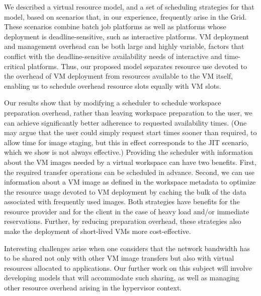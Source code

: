 \documentclass[singlespace]{ccw_chithesis}
\begin{document}
We described a virtual resource model, and a set of scheduling
strategies for that model, based on scenarios that, in our experience,
frequently arise in the Grid. These scenarios combine batch job
platforms as well as platforms whose deployment is
deadline{}-sensitive, such as interactive platforms. VM deployment and
management overhead can be both large and highly variable, factors that
conflict with the deadline{}-sensitive availability needs of
interactive and time{}-critical platforms. Thus, our proposed model
separates resource use devoted to the overhead of VM deployment from
resources available to the VM itself, enabling us to schedule overhead
resource slots equally with VM slots.

Our results show that by modifying a scheduler to schedule workspace
preparation overhead, rather than leaving workspace preparation to the
user, we can achieve significantly better adherence to requested
availability times. (One may argue that the user could simply request
start times sooner than required, to allow time for image staging, but
this in effect corresponds to the JIT scenario, which we show is not
always effective.) Providing the scheduler with information about the
VM images needed by a virtual workspace can have two benefits. First,
the required transfer operations can be scheduled in advance. Second,
we can use information about a VM image as defined in the workspace
metadata to optimize the resource usage devoted to VM deployment by
caching the bulk of the data associated with frequently used images.
Both strategies have benefits for the resource provider and for the
client in the case of heavy load and/or immediate reservations.
Further, by reducing preparation overhead, these strategies also make
the deployment of short{}-lived VMs more cost{}-effective.

Interesting challenges arise when one considers that the network
bandwidth has to be shared not only with other VM image transfers but
also with virtual resources allocated to applications. Our further work
on this subject will involve developing models that will accommodate
such sharing, as well as managing other resource overhead arising in
the hypervisor context.


\newpage
{}
\begin{singlespace}


\end{singlespace}

%
%
\end{document}
